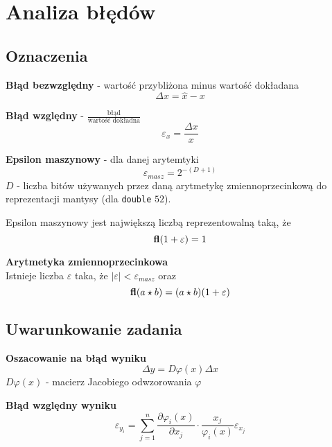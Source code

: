 \documentclass[../mn-notatki.tex]{subfiles}
\begin{document}
\section{Analiza błędów}

\subsection{Oznaczenia}

\begin{tcolorbox}
\textbf{Błąd bezwzględny} - wartość przybliżona minus wartość dokładana
\[
\Delta x = \hat{x} - x
\]
\end{tcolorbox}

\begin{tcolorbox}
\textbf{Błąd względny} - $\frac{\text{błąd}}{\text{wartość dokładna}}$
\[
\varepsilon_x = \frac{\Delta x}{x}
\]
\end{tcolorbox}

\begin{tcolorbox}
\textbf{Epsilon maszynowy} - dla danej arytemtyki
\[
\varepsilon_{masz} = 2^{-(D+1)}
\]
$D$ - liczba bitów używanych przez daną arytmetykę zmiennoprzecinkową do
reprezentacji mantysy (dla \texttt{double} $52$).

Epsilon maszynowy jest największą liczbą reprezentowalną taką, że
\[
\textbf{fl}(1 + \varepsilon) = 1
\]
\end{tcolorbox}

\begin{tcolorbox}
\textbf{Arytmetyka zmiennoprzecinkowa}\\
Istnieje liczba $\varepsilon$ taka, że $|\varepsilon| < \varepsilon_{masz}$ oraz
\[
\textbf{fl}(a \star b) = (a \star b)(1 + \varepsilon)
\]
\end{tcolorbox}


\subsection{Uwarunkowanie zadania}

\begin{tcolorbox}
\textbf{Oszacowanie na błąd wyniku}\\
\[
\Delta y = D \varphi(x) \Delta x
\]
$D \varphi(x)$ - macierz Jacobiego odwzorowania $\varphi$
\end{tcolorbox}

\begin{tcolorbox}
\textbf{Błąd względny wyniku}\\
\[
\varepsilon_{y_i} = \sum_{j=1}^{n} \frac{\partial \varphi_i(x)}{\partial x_j}
\cdot \frac{x_j}{\varphi_i(x)} \varepsilon_{x_j}
\]
\end{tcolorbox}
\end{document}

